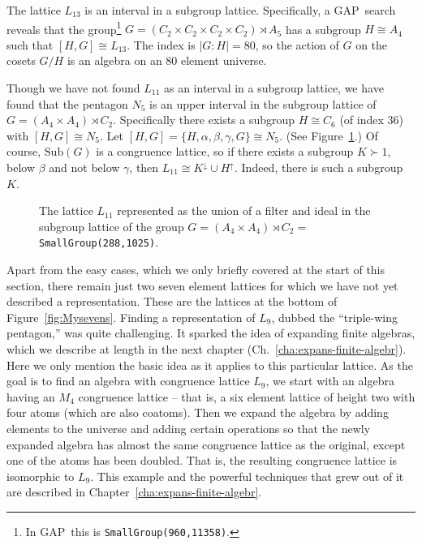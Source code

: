 \documentclass[cm,dissertation,actual,final]{uhthesis}
\theoremstyle{plain}
\theoremstyle{definition}
\theoremstyle{remark}
\numberwithin{theorem}{section}
\numberwithin{claim}{chapter}
\numberwithin{equation}{section}
\numberwithin{conjecture}{chapter}
\newcommand{\<}{\ensuremath{\langle}}
\renewcommand{\>}{\ensuremath{\rangle}}
\newcommand{\Sub}{\ensuremath{\mathrm{Sub}}}
\newcommand{\GAP}{\textsf{GAP}}
\newcommand{\0}{\ensuremath{\mathbf{0}}}
\newcommand{\1}{\ensuremath{\mathbf{1}}}
\newcommand{\2}{\ensuremath{\mathbf{2}}}
\newcommand{\3}{\ensuremath{\mathbf{3}}}
\newcommand{\4}{\ensuremath{\mathbf{4}}}
\newcommand{\5}{\ensuremath{\mathbf{5}}}
\begin{document}
The lattice  $L_{13}$ is an interval in a subgroup lattice.  Specifically, 
a \GAP\ search reveals that the group\footnote{In \GAP\ this is {\tt SmallGroup(960,11358)}.}
$G = (C_2 \times C_2 \times C_2 \times C_2) \rtimes A_5$
has a subgroup $H\cong A_4$ such that $[H,G]\cong L_{13}$.
The index is $|G:H|=80$, so the action of $G$ on the cosets $G/H$ is an
algebra on an 80 element universe.

Though we have not found $L_{11}$ as an interval in a subgroup lattice, we
have found that the pentagon $N_5$ is an upper interval 
in the subgroup lattice of $G=(A_4 \times A_4) \rtimes C_2$.
Specifically there exists a subgroup $H \cong C_6$ (of index 36) with 
$[H, G] \cong N_5$.  
Let $[H, G] = \{H, \alpha, \beta, \gamma, G\} \cong N_5$.  (See Figure~\ref{fig:L11}.)
Of course, $\Sub(G)$ is a congruence lattice, so
if there exists a subgroup $K \succ 1$, below $\beta$ and not below $\gamma$, 
then $L_{11} \cong K^\downarrow \cup H^\uparrow$.  Indeed, there is such a
subgroup $K$.

\begin{figure}
\begin{center}
  {
}
\end{center}
  \caption{The lattice $L_{11}$ represented as the union of a filter and ideal in the
subgroup lattice of the group  $G = (A_4 \times A_4) \rtimes C_2 = $ {\tt SmallGroup(288,1025)}.}
  \label{fig:L11}
\end{figure}

Apart from the easy cases, which we only briefly covered at the start of this
section, there remain just two seven element lattices for which we have not yet
described a representation.  These are the lattices at the bottom of
Figure~\ref{fig:Mysevens}.
Finding a representation of $L_9$, dubbed the ``triple-wing pentagon,'' was
quite challenging.  It sparked the idea of expanding finite algebras, which 
we describe at length in the next chapter (Ch.~\ref{cha:expans-finite-algebr}).
Here we only mention the basic idea as it applies to this particular lattice.  
As the goal is to find an algebra with congruence lattice $L_9$, we start with an
algebra having an $M_4$ congruence lattice -- that is, a six element lattice of
height two with four atoms (which are also coatoms).  Then we expand the algebra
by adding elements to the universe and adding certain operations so that the
newly expanded algebra has almost the same congruence lattice as the original, except
one of the atoms has been doubled.  That is, the resulting congruence lattice is
isomorphic to $L_9$.  This example and the powerful techniques that grew out of it
are described in Chapter~\ref{cha:expans-finite-algebr}.
\end{document}
